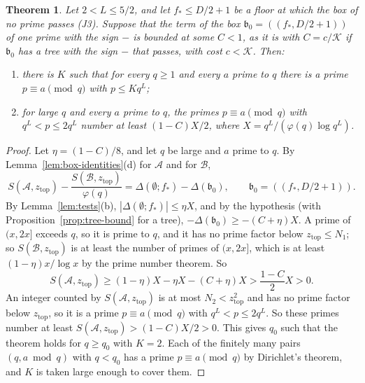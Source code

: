 \documentclass[11pt]{article}
\newtheorem{theorem}{Theorem}[section]
\theoremstyle{definition}
\begin{document}
\begin{theorem}\label{thm:tree}
Let $2 < L \le 5/2$, and let $f_* \le D/2 + 1$ be a floor at which the box of no prime passes (J3). Suppose that the
term of the box $\mathfrak b_0 = ((f_*, D/2 + 1))$ of one prime with the sign $-$ is bounded at some $C < 1$, as it is
with $C = c/\mathcal K$ if $\mathfrak b_0$ has a tree with the sign $-$ that passes, with cost $c < \mathcal K$. Then:
\begin{enumerate}
\item[(a)] there is $K$ such that for every $q \ge 1$ and every $a$ prime to $q$ there is a prime $p \equiv a \pmod q$
  with $p \le Kq^L$;
\item[(b)] for large $q$ and every $a$ prime to $q$, the primes $p \equiv a \pmod q$ with $q^L < p \le 2q^L$ number at
  least $(1 - C)X/2$, where $X = q^L/(\varphi(q) \log q^L)$.
\end{enumerate}
\end{theorem}

\begin{proof}
Let $\eta = (1 - C)/8$, and let $q$ be large and $a$ prime to $q$. By
Lemma~\ref{lem:box-identities}(d) for $\mathcal A$ and for $\mathcal B$,
\[
  S(\mathcal A, z_{\mathrm{top}}) - \frac{S(\mathcal B, z_{\mathrm{top}})}{\varphi(q)} = \Delta(\emptyset; f_*) -
  \Delta(\mathfrak b_0), \qquad \mathfrak b_0 = ((f_*, D/2 + 1)).
\]
By Lemma~\ref{lem:tests}(b), $|\Delta(\emptyset; f_*)| \le \eta X$, and by the hypothesis (with
Proposition~\ref{prop:tree-bound} for a tree), $-\Delta(\mathfrak b_0) \ge -(C + \eta)X$. A prime of $(x, 2x]$ exceeds
$q$, so it is prime to $q$, and it has
no prime factor below $z_{\mathrm{top}} \le N_1$; so $S(\mathcal B, z_{\mathrm{top}})$ is at least the number of primes
of $(x, 2x]$, which is at least $(1 - \eta)x/\log x$ by the prime number theorem. So
\[
  S(\mathcal A, z_{\mathrm{top}}) \ge (1 - \eta)X - \eta X - (C + \eta)X > \frac{1 - C}2 X > 0.
\]
An integer counted by $S(\mathcal A, z_{\mathrm{top}})$ is at most $N_2 < z_{\mathrm{top}}^2$ and has no prime factor
below $z_{\mathrm{top}}$, so it is a prime $p \equiv a \pmod q$ with $q^L < p \le 2q^L$. So these primes number at
least $S(\mathcal A, z_{\mathrm{top}}) > (1 - C)X/2 > 0$. This gives $q_0$ such that the theorem holds for $q \ge q_0$
with $K = 2$. Each of the finitely many pairs $(q, a \bmod q)$ with $q < q_0$ has a prime
$p \equiv a \pmod q$ by Dirichlet's theorem, and $K$ is taken large enough to cover them.
\end{proof}
\end{document}
